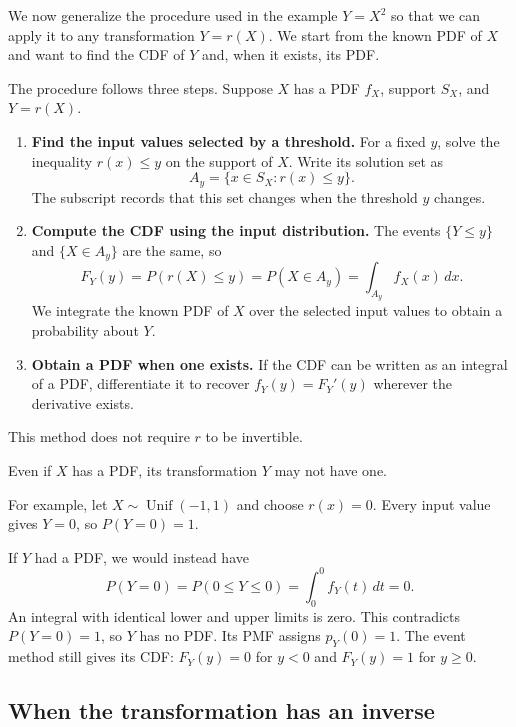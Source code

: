 \documentclass[a4paper,12pt,oneside]{report}
\begin{document}
We now generalize the procedure used in the example $Y=X^2$
so that we can apply it to any transformation $Y=r(X)$.
We start from the known PDF of $X$ and want to find the CDF
of $Y$ and, when it exists, its PDF.

The procedure follows three steps. Suppose $X$
has a PDF $f_X$, support $S_X$, and $Y=r(X)$.

\begin{enumerate}
  \item \textbf{Find the input values selected by a threshold.}
    For a fixed $y$, solve the inequality $r(x)\leq y$ on
    the support of $X$. Write its solution set as
    \[
      A_y=\{x\in S_X:r(x)\leq y\}.
    \]
    The subscript records that this set changes when the
    threshold $y$ changes.
  \item \textbf{Compute the CDF using the input distribution.}
    The events $\{Y\leq y\}$ and $\{X\in A_y\}$ are the same,
    so
    \[
      F_Y(y)=P(r(X)\leq y)=P(X\in A_y)
        =\int_{A_y}f_X(x)\,dx.
    \]
    We integrate the known PDF of $X$ over the selected
    input values to obtain a probability about $Y$.
  \item \textbf{Obtain a PDF when one exists.}
    If the CDF can be written as an integral of a PDF,
    differentiate it to recover $f_Y(y)=F_Y'(y)$ wherever
    the derivative exists.
\end{enumerate}

\begin{notebox}
This method does not require $r$ to be invertible.
\end{notebox}

\begin{notebox}
Even if $X$ has a PDF, its transformation $Y$ may not have one.

For example, let $X\sim\operatorname{Unif}(-1,1)$ and choose
$r(x)=0$. Every input value gives $Y=0$, so $P(Y=0)=1$.

If $Y$ had a PDF, we would instead have
\[
  P(Y=0)=P(0\leq Y\leq0)=\int_0^0 f_Y(t)\,dt=0.
\]
An integral with identical lower and upper limits is zero.
This contradicts $P(Y=0)=1$, so $Y$ has no PDF.
Its PMF assigns $p_Y(0)=1$.
The event method still gives its CDF: $F_Y(y)=0$ for $y<0$
and $F_Y(y)=1$ for $y\geq0$.
\end{notebox}

\clearpage
\subsection{When the transformation has an inverse}
\label{sec:invertible-transformation}
\end{document}
